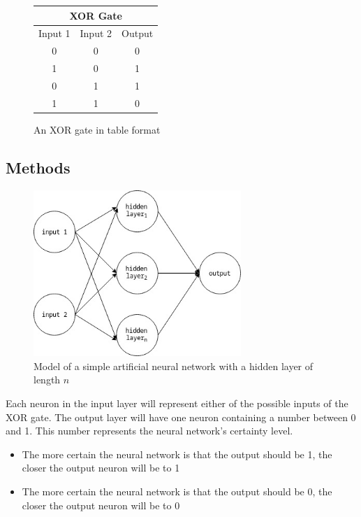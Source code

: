 \documentclass[12pt]{article}
\begin{document}
\begin{figure}[h]
  \begin{center}
  \begin{tabular}{|c|c|c|}
  \hline
  \multicolumn{3}{|c|}{XOR Gate} \\
  \hline
  Input 1 & Input 2 & Output \\
  \hline
  0 & 0 & 0 \\
  1 & 0 & 1 \\
  0 & 1 & 1 \\
  1 & 1 & 0 \\
  \hline
  \end{tabular}
  \end{center}
  \caption{An XOR gate in table format \label{xortable}}
\end{figure}

\subsection{Methods \label{methods}}

\begin{figure}
  \begin{center}
  \includegraphics[width=0.7\textwidth]{ANN-diagram.jpg}
  \caption{Model of a simple artificial neural network with a hidden layer of length \(n\)\label{anndiagram}}
  \end{center}
\end{figure}

Each neuron in the input layer will represent either of the possible inputs of the XOR gate. The output layer will have one neuron containing a number between 0 and 1. This number represents the neural network's certainty level.

\begin{itemize}
  \item The more certain the neural network is that the output should be 1, the closer the output neuron will be to 1
  \item The more certain the neural network is that the output should be 0, the closer the output neuron will be to 0
\end{itemize}
\end{document}
